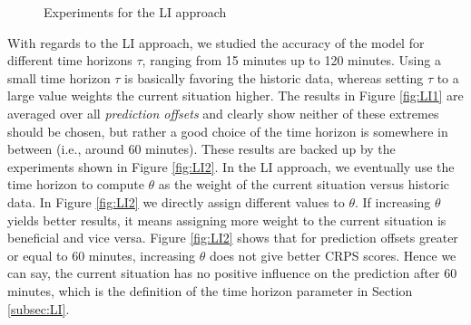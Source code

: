 \begin{figure}[h]
    \centering
        		\vspace{-0.2cm}
    \caption{Experiments for the LI approach}\label{fig:LI_results}
    		\vspace{-0.4cm}
\end{figure}



With regards to the LI approach, we studied the accuracy of the model for
different time horizons $\tau$, ranging from 15 minutes up to 120 minutes. Using a small time horizon $\tau$ is basically favoring the historic data, whereas setting $\tau$ to a large value weights the current situation higher. The results in Figure \ref{fig:LI1} are averaged over all \textit{prediction
offsets} and clearly show neither of these extremes should be chosen, but rather a good choice of the time horizon is somewhere in between (i.e., around 60 minutes). These results are backed up by the experiments shown in Figure \ref{fig:LI2}. In the LI approach, we eventually use the time horizon to compute $\theta$ as the weight of the current situation versus historic data. In Figure \ref{fig:LI2} we directly assign different values to $\theta$. If increasing $\theta$ yields better results, it means assigning more weight to the current situation is beneficial and vice versa. Figure \ref{fig:LI2} shows that for prediction offsets greater or equal to 60 minutes, increasing $\theta$ does not give better CRPS scores. Hence we can say, the current situation has no positive influence on the prediction after 60 minutes, which is the definition of the time horizon parameter in Section \ref{subsec:LI}.


